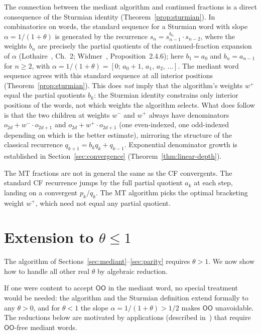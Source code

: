 \documentclass[12pt]{article}
\theoremstyle{definition}
\theoremstyle{remark}
\theoremstyle{plain}
\newcommand{\OO}{\mathsf{O}}
\newcommand{\wplus}{w^{+}}
\newcommand{\wminus}{w^{-}}
\begin{document}
The connection between the mediant algorithm and continued fractions is a direct
consequence of the Sturmian identity (Theorem~\ref{prop:sturmian}).
In combinatorics on words, the standard sequence for a Sturmian word with slope
$\alpha = 1/(1+\theta)$ is generated by the recurrence $s_n = s_{n-1}^{b_n} \cdot s_{n-2}$,
where the weights $b_n$ are precisely the partial quotients of the continued-fraction
expansion of $\alpha$ (Lothaire~\cite{lothaire2002}, Ch.~2; Widmer~\cite{widmer2010},
Proposition~2.4.6); here $b_1 = a_0$ and $b_n = a_{n-1}$ for $n \geq 2$, with
$\alpha = 1/(1+\theta) = [0;\, a_0+1,\, a_1,\, a_2,\, \ldots]$.
The mediant word sequence agrees with this standard sequence at all interior positions
(Theorem~\ref{prop:sturmian}).
This does \emph{not} imply that the algorithm's weights $\wplus$ equal the partial quotients
$b_k$: the Sturmian identity constrains only interior positions of the words, not which
weights the algorithm selects.
What does follow is that the two children at weights $\wminus$ and $\wplus$ always have
denominators $o_{2d} + \wminus \cdot o_{2d+1}$ and $o_{2d} + \wplus \cdot o_{2d+1}$
(one even-indexed, one odd-indexed depending on which is the better estimate),
mirroring the structure of the classical recurrence $q_{k+1} = b_k q_k + q_{k-1}$.
Exponential denominator growth is established in Section~\ref{sec:convergence} (Theorem~\ref{thm:linear-depth}).

The MT fractions are not in general the same as the CF convergents.
The standard CF recurrence jumps by the full partial quotient $a_k$ at each step,
landing on a convergent $p_k/q_k$.
The MT algorithm picks the optimal bracketing weight $\wplus$, which need not
equal any partial quotient.

\FloatBarrier
\section{Extension to $\theta \leq 1$}
\label{sec:extension}

The algorithm of Sections~\ref{sec:mediant}--\ref{sec:parity} requires $\theta > 1$.
We now show how to handle all other real $\theta$ by algebraic reduction.

If one were content to accept $\OO\OO$ in the mediant word, no special treatment
would be needed: the algorithm and the Sturmian definition extend formally to any
$\theta > 0$, and for $\theta < 1$ the slope $\alpha = 1/(1+\theta) > 1/2$ makes
$\OO\OO$ unavoidable.
The reductions below are motivated by applications (described in~\cite{paper77})
that require $\OO\OO$-free mediant words.
\end{document}
